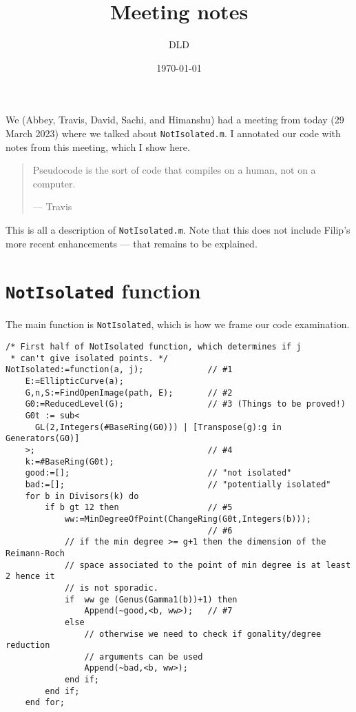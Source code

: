 \documentclass[11pt,reqno]{amsart}
\title{Meeting notes}
\author{DLD}
\date{\today}
\theoremstyle{plain}
\theoremstyle{definition}
\begin{document}
\maketitle

We (Abbey, Travis, David, Sachi, and Himanshu) had a meeting
from today (29 March 2023) where we talked about
\texttt{NotIsolated.m}.
I annotated our code with notes from this meeting, which I show
here.

\vspace*{0.2cm}
\begin{quote}
  Pseudocode is the sort of code that compiles on a human, not on a computer.

  --- Travis
\end{quote}

This is all a description of \texttt{NotIsolated.m}. Note that this does
not include Filip's more recent enhancements --- that remains to be explained.

\section{\texttt{NotIsolated} function}\label{sec:notisolated}

The main function is \texttt{NotIsolated}, which is how we frame our code
examination.

\begin{verbatim}
/* First half of NotIsolated function, which determines if j
 * can't give isolated points. */
NotIsolated:=function(a, j);             // #1
    E:=EllipticCurve(a);
    G,n,S:=FindOpenImage(path, E);       // #2
    G0:=ReducedLevel(G);                 // #3 (Things to be proved!)
    G0t := sub<
      GL(2,Integers(#BaseRing(G0))) | [Transpose(g):g in Generators(G0)]
    >;                                   // #4
    k:=#BaseRing(G0t);
    good:=[];                            // "not isolated"
    bad:=[];                             // "potentially isolated"
    for b in Divisors(k) do
        if b gt 12 then                  // #5
            ww:=MinDegreeOfPoint(ChangeRing(G0t,Integers(b)));
                                         // #6
            // if the min degree >= g+1 then the dimension of the Reimann-Roch
            // space associated to the point of min degree is at least 2 hence it
            // is not sporadic.
            if  ww ge (Genus(Gamma1(b))+1) then
                Append(~good,<b, ww>);   // #7
            else
                // otherwise we need to check if gonality/degree reduction
                // arguments can be used
                Append(~bad,<b, ww>);
            end if;
        end if;
    end for;
\end{verbatim}
\end{document}
